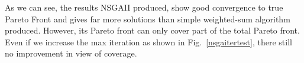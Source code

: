 \documentclass[10pt,journal,compsoc]{IEEEtran}
\newcommand{\Fig}[1]{Fig.~\ref{#1}}
\begin{document}
\begin{table}[H]
\caption{NSGAII Parameter Selection}
\label{nsgaparatable}
\centering
{}
\end{table}

As we can see, the results NSGAII produced, show good convergence to true Pareto Front and gives far more solutions than simple weighted-sum algorithm produced. However, its Pareto front can only cover part of the total Pareto front. Even if we increase the max iteration as shown in \Fig{nsgaitertest}, there still no improvement in view of coverage. 
\end{document}

